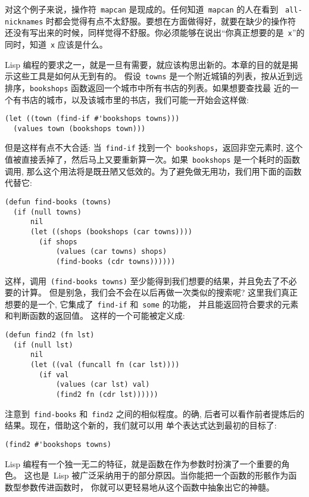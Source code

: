 对这个例子来说，操作符~\texttt{mapcan} 是现成的。任何知道~\texttt{mapcan} 的人在看到
~\texttt{all-nicknames} 时都会觉得有点不太舒服。要想在\bup{}方面做得好，就要在缺少的操作符
还没有写出来的时候，同样觉得不舒服。你必须能够在说出``你真正想要的是~\verb|x|''的同时，知道~\verb|x| 应该是什么。

Lisp 编程的要求之一，就是一旦有需要，就应该构思出新的\utility{}。本章的目的就是揭示这些工具是如何从无到有的。
假设~\texttt{towns} 是一个附近城镇的列表，按从近到远排序，\texttt{bookshops}
\label{page:bookshops} 函数返回一个城市中所有书店的列表。如果想要查找最
近的一个有书店的城市，以及该城市里的书店，我们可能一开始会这样做:
\begin{lstlisting}
(let ((town (find-if #'bookshops towns)))
  (values town (bookshops town)))
\end{lstlisting}
但是这样有点不大合适: 当~\texttt{find-if} 找到一个~\texttt{bookshops}，返回非空元素时,
这个值被直接丢掉了，然后马上又要重新算一次。如果~\texttt{bookshops} 是一个耗时的函数调用,
那么这个用法将是既丑陋又低效的。为了避免做无用功，我们用下面的函数代替它:
\begin{lstlisting}
(defun find-books (towns)
  (if (null towns)
      nil
      (let ((shops (bookshops (car towns))))
        (if shops
            (values (car towns) shops)
            (find-books (cdr towns))))))
\end{lstlisting}
\label{func:find-books}
这样，调用~\texttt{(find-books towns)} 至少能得到我们想要的结果，并且免去了不必要的计算。
但是别急，我们会不会在以后再做一次类似的搜索呢? 这里我们真正想要的是一个\utility{},
它集成了~\texttt{find-if} 和~\texttt{some} 的功能， 并且能返回符合要求的元素和判断函数的返回值。
这样的一个\utility{}可能被定义成:
\begin{lstlisting}
(defun find2 (fn lst)
  (if (null lst)
      nil
      (let ((val (funcall fn (car lst))))
        (if val
            (values (car lst) val)
            (find2 fn (cdr lst))))))
\end{lstlisting}
注意到~\texttt{find-books} 和~\texttt{find2} 之间的相似程度。的确,
后者可以看作前者提炼后的结果。现在，借助这个新的\utility{}，我们就可以用
单个表达式达到最初的目标了:
\begin{lstlisting}
(find2 #'bookshops towns)
\end{lstlisting}

Lisp 编程有一个独一无二的特征，就是函数在作为参数时扮演了一个重要的角色。
这也是~Lisp 被广泛采纳用于\bup{}的部分原因。当你能把一个函数的形骸作为函数型参数传进函数时，
你就可以更轻易地从这个函数中抽象出它的神髓。

